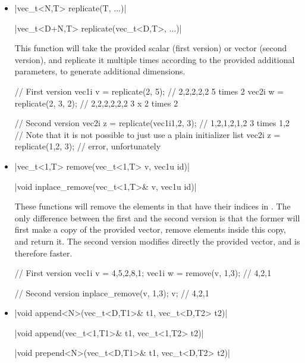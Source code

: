 \documentclass[12pt]{report}
\newenvironment{example}
{
    \begin{mdframed}[style=example,frametitle={Example}]
}
{
    \end{mdframed}
}
\begin{document}
\begin{itemize}
\item \cppinline|vec_t<N,T>   replicate(T, ...)| 

      \cppinline|vec_t<D+N,T> replicate(vec_t<D,T>, ...)|


This function will take the provided scalar (first version) or vector (second version), and replicate it multiple times according to the provided additional parameters, to generate additional dimensions.

\begin{example}
\begin{cppcode}
// First version
vec1i v = replicate(2, 5); // {2,2,2,2,2} 5 times 2
vec2i w = replicate(2, 3, 2); // {{2,2},{2,2},{2,2}} 3 x 2 times 2

// Second version
vec2i z = replicate(vec1i{1,2}, 3); // {{1,2},{1,2},{1,2}} 3 times {1,2}
// Note that it is not possible to just use a plain initializer list
vec2i z = replicate({1,2}, 3); // error, unfortunately
\end{cppcode}
\end{example}

\item \cppinline|vec_t<1,T> remove(vec_t<1,T> v, vec1u id)| 

\cppinline|void inplace_remove(vec_t<1,T>& v, vec1u id)| 

These functions will remove the elements in  that have their indices in . The only difference between the first and the second version is that the former will first make a copy of the provided vector, remove elements inside this copy, and return it. The second version modifies directly the provided vector, and is therefore faster.

\begin{example}
\begin{cppcode}
// First version
vec1i v = {4,5,2,8,1};
vec1i w = remove(v, {1,3}); // {4,2,1}

// Second version
inplace_remove(v, {1,3});
v; // {4,2,1}
\end{cppcode}
\end{example}

\item \cppinline|void append<N>(vec_t<D,T1>& t1, vec_t<D,T2> t2)| 

\cppinline|void append(vec_t<1,T1>& t1, vec_t<1,T2> t2)|

\cppinline|void prepend<N>(vec_t<D,T1>& t1, vec_t<D,T2> t2)| 


\end{itemize}
\end{document}
